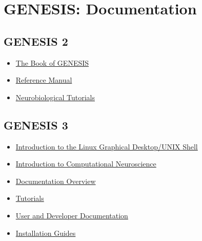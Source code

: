 \documentclass[12pt]{article}
\begin{document}
\section*{GENESIS: Documentation}

\subsection*{GENESIS 2}

\begin{itemize}
 
 \item \href{http://www.genesis-sim.org/documentation}{The Book of GENESIS}

 \item \href{http://www.genesis-sim.org/GENESIS/Hyperdoc/Manual.html}{Reference Manual}

\item \href{http://www.genesis-sim.org/GENESIS/Tutorials_summary.html}{Neurobiological Tutorials}

\end{itemize}

\subsection*{GENESIS 3}

\begin{itemize}

 \item \href{../document-homepage/document-homepage.pdf}{Introduction to the Linux Graphical Desktop/UNIX Shell}

\item \href{../introduction-compneurosci-1/introduction-compneurosci-1.pdf}{Introduction to Computational Neuroscience}

\item \href{../document-overview/document-overview.pdf}{Documentation Overview}

\item \href{../contents-level1/contents-level1.pdf/}{Tutorials}

\item \href{../contents-level2/contents-level2.pdf}{User and Developer Documentation}

\item \href{../installation/installation.pdf}{Installation Guides}

\end{itemize}
\end{document}

